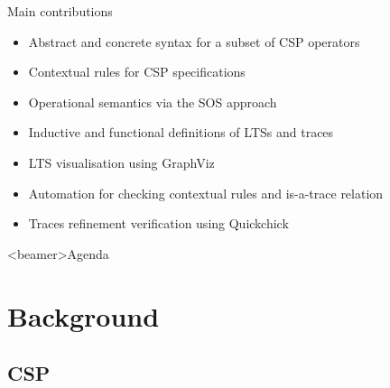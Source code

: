 \documentclass[t]{beamer}
\begin{document}
\begin{frame}{Main contributions}
	\begin{itemize}
		\item Abstract and concrete syntax for a subset of CSP operators\\[2ex]
		\item Contextual rules for CSP specifications\\[2ex]
		\item Operational semantics via the SOS approach\\[2ex]
		\item Inductive and functional definitions of LTSs and traces\\[2ex]
		\item LTS visualisation using GraphViz\\[2ex]
		\item Automation for checking contextual rules and is-a-trace relation\\[2ex]
		\item Traces refinement verification using Quickchick
	\end{itemize}
\end{frame}

\begin{frame}<beamer>{Agenda}
	\tableofcontents
\end{frame}

\section{Background}

\subsection{CSP}
\end{document}
